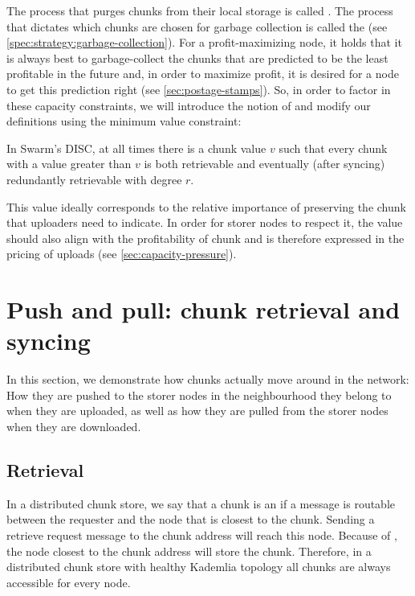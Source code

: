 The process that purges chunks from their local storage is called . The process that dictates which chunks are chosen for garbage collection is called the  (see  \ref{spec:strategy:garbage-collection}). For a profit-maximizing node, it holds that it is always best to garbage-collect the chunks that are predicted to be the least profitable in the future and, in order to maximize profit, it is desired for a node to get this prediction right (see \ref{sec:postage-stamps}). So, in order to factor in these capacity constraints, we will introduce the notion of  and modify our definitions using the minimum value constraint:

In Swarm's DISC, at all times there is a chunk value $v$ such that every chunk with a value greater than $v$ is both retrievable and eventually (after syncing) redundantly retrievable with degree $r$. 

This value ideally corresponds to the relative importance of preserving the chunk that uploaders need to indicate. In order for storer nodes to respect it, the value should also align with the profitability of chunk and is therefore expressed in the pricing of uploads (see \ref{sec:capacity-pressure}).


\section{Push and pull: chunk retrieval and syncing\statusgreen}\label{sec:push-and-pull}
\green{}
In this section, we demonstrate how chunks actually move around in the network: How they are pushed to the storer nodes in the neighbourhood they belong to when they are uploaded, as well as how they are pulled from the storer nodes when they are downloaded.

\subsection{Retrieval\statusgreen}\label{sec:retrieval}

In a distributed chunk store, we say that a chunk is an  if a message is routable between the requester and the node that is closest to the chunk. Sending a retrieve request message to the chunk address will reach this node.  Because of , the node closest to the chunk address will store the chunk. Therefore, in a  distributed chunk store with healthy Kademlia topology all chunks are always accessible for every node.

